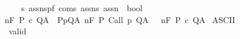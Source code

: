 \begin{isabellebody}
\ \ \ \ \ {\isacharprime}s\ assn{\isacharcomma}{\isacharparenleft}{\isacharprime}s{\isacharcomma}{\isacharprime}p{\isacharcomma}{\isacharprime}f{\isacharparenright}\ com{\isacharcomma}{\isacharprime}s\ assn{\isacharcomma}{\isacharprime}s\ assn{\isacharbrackright}\ {\isasymRightarrow}\ bool{\isachardoublequoteclose}\isanewline
\ \ \ \ \ \ \ \ \ \ \ \ \ \ \ \ {\isacharparenleft}{\isachardoublequoteopen}{\isacharunderscore}{\isacharcomma}{\isacharunderscore}{\isasymTurnstile}{\isacharunderscore}{\isacharcolon}\isactrlbsub {\isacharprime}{\isacharslash}{\isacharunderscore}\isactrlesub {\isacharslash}\ {\isacharunderscore}\ {\isacharunderscore}\ {\isacharunderscore}{\isacharcomma}{\isacharunderscore}{\isachardoublequoteclose}\ \ {\isacharbrackleft}{}{}{\isacharcomma}{}{}{\isacharcomma}{}{}{\isacharcomma}{}{}{\isacharcomma}{}{}{}{}{\isacharcomma}\ {}{}{\isacharcomma}\ {}{}{}{}{\isacharcomma}{}{}{}{}{\isacharbrackright}\ {}{}{\isacharparenright}\isanewline
{}\isanewline
\ {\isachardoublequoteopen}{\isasymGamma}{\isacharcomma}{\isasymTheta}{\isasymTurnstile}n{\isacharcolon}\isactrlbsub {\isacharslash}F\isactrlesub \ P\ c\ Q{\isacharcomma}A\ {\isasymequiv}\ {\isacharparenleft}{\isasymforall}{\isacharparenleft}P{\isacharcomma}p{\isacharcomma}Q{\isacharcomma}A{\isacharparenright}{\isasymin}{\isasymTheta}{\isachardot}\ {\isasymGamma}{\isasymTurnstile}n{\isacharcolon}\isactrlbsub {\isacharslash}F\isactrlesub \ P\ {\isacharparenleft}Call\ p{\isacharparenright}\ Q{\isacharcomma}A{\isacharparenright}\ {\isasymlongrightarrow}\ {\isasymGamma}\ {\isasymTurnstile}n{\isacharcolon}\isactrlbsub {\isacharslash}F\isactrlesub \ P\ c\ Q{\isacharcomma}A{\isachardoublequoteclose}\isanewline
\isanewline
\isanewline
{}\isamarkupfalse%
\ {\isacharparenleft}ASCII{\isacharparenright}\isanewline
\ \ valid\ \ {\isacharparenleft}{\isachardoublequoteopen}{\isacharunderscore}{\isacharbar}{\isacharequal}{\isacharprime}{\isacharslash}{\isacharunderscore}{\isacharslash}\ {\isacharunderscore}\ {\isacharunderscore}\ {\isacharunderscore}{\isacharcomma}{\isacharunderscore}{\isachardoublequoteclose}\ \ {\isacharbrackleft}{}{}{\isacharcomma}{}{}{\isacharcomma}{}{}{}{}{\isacharcomma}\ {}{}{\isacharcomma}\ {}{}{}{}{\isacharcomma}{}{}{}{}{\isacharbrackright}\ {}{}{\isacharparenright}\ \isanewline

\end{isabellebody}
